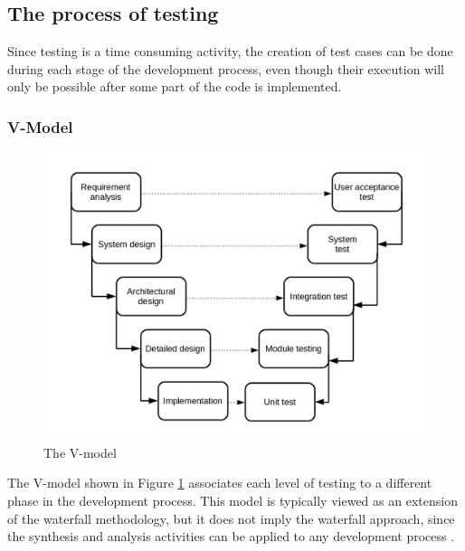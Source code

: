 \subsection{The process of testing}

Since testing is a time consuming activity, the creation of test cases can be done during each stage of the development process, even though their execution will only be possible after some part of the code is implemented.

\subsubsection{V-Model}

\begin{figure}[htb]
\includegraphics[width=1.0\textwidth]{figuras/vModel}
\caption{\label{fig:vModel}The V-model}
\end{figure}

The V-model shown in Figure \ref{fig:vModel} associates each level of testing to a different phase in the development process. This model is typically viewed as an extension of the waterfall methodology, but it does not imply the waterfall approach, since the synthesis and analysis activities can be applied to any development process \cite{Ammann:08}. 

